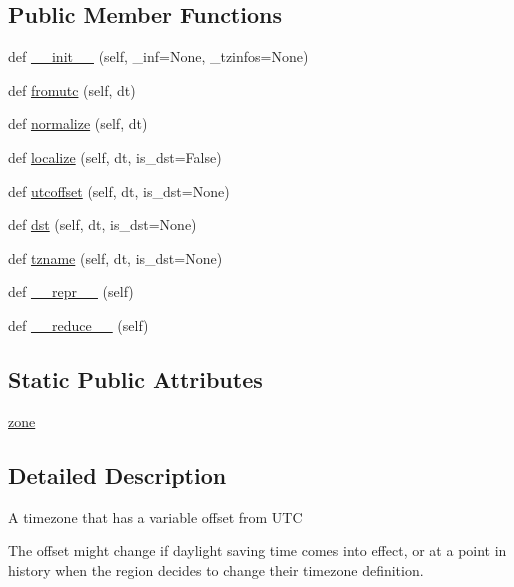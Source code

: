 \subsection*{Public Member Functions}
\begin{DoxyCompactItemize}
\item 
def \hyperlink{classpytz_1_1tzinfo_1_1DstTzInfo_a03fe0e0bb04ea6e69779187e24ff4ffe}{\+\_\+\+\_\+init\+\_\+\+\_\+} (self, \+\_\+inf=None, \+\_\+tzinfos=None)
\item 
def \hyperlink{classpytz_1_1tzinfo_1_1DstTzInfo_a94e72e04262b17936c55030253811960}{fromutc} (self, dt)
\item 
def \hyperlink{classpytz_1_1tzinfo_1_1DstTzInfo_a87d54c8354b70d420fa322c8577ad659}{normalize} (self, dt)
\item 
def \hyperlink{classpytz_1_1tzinfo_1_1DstTzInfo_af64331f2a0016d6ca9a4cfcc4d86ad89}{localize} (self, dt, is\+\_\+dst=False)
\item 
def \hyperlink{classpytz_1_1tzinfo_1_1DstTzInfo_a9d88b72000f482255287ff9ad6ca2f07}{utcoffset} (self, dt, is\+\_\+dst=None)
\item 
def \hyperlink{classpytz_1_1tzinfo_1_1DstTzInfo_adbd7011c964e122ada53385ecda40bd2}{dst} (self, dt, is\+\_\+dst=None)
\item 
def \hyperlink{classpytz_1_1tzinfo_1_1DstTzInfo_a24a2e17fde25003aab9059156c9bd06f}{tzname} (self, dt, is\+\_\+dst=None)
\item 
def \hyperlink{classpytz_1_1tzinfo_1_1DstTzInfo_a610716b635d5b1adddeed97149da9d61}{\+\_\+\+\_\+repr\+\_\+\+\_\+} (self)
\item 
def \hyperlink{classpytz_1_1tzinfo_1_1DstTzInfo_a999e44b21102d021d9637fe267652bff}{\+\_\+\+\_\+reduce\+\_\+\+\_\+} (self)
\end{DoxyCompactItemize}
\subsection*{Static Public Attributes}
\begin{DoxyCompactItemize}
\item 
\hyperlink{classpytz_1_1tzinfo_1_1DstTzInfo_a520c9787786c4b8df16a6978021e0188}{zone}
\end{DoxyCompactItemize}


\subsection{Detailed Description}
\begin{DoxyVerb}A timezone that has a variable offset from UTC

The offset might change if daylight saving time comes into effect,
or at a point in history when the region decides to change their
timezone definition.
\end{DoxyVerb}
 

